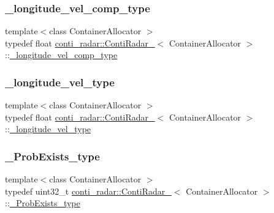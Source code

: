 \subsubsection{\texorpdfstring{\+\_\+longitude\+\_\+vel\+\_\+comp\+\_\+type}{\_longitude\_vel\_comp\_type}}
{\footnotesize\ttfamily template$<$class Container\+Allocator $>$ \\
typedef float \hyperlink{structconti__radar_1_1ContiRadar__}{conti\+\_\+radar\+::\+Conti\+Radar\+\_\+}$<$ Container\+Allocator $>$\+::\hyperlink{structconti__radar_1_1ContiRadar___a3f85fb9d65be899731b3261b3e788197}{\+\_\+longitude\+\_\+vel\+\_\+comp\+\_\+type}}

\mbox{\label{structconti__radar_1_1ContiRadar___af042240d6e52b741e4a641e13e8c0b09}} 
\subsubsection{\texorpdfstring{\+\_\+longitude\+\_\+vel\+\_\+type}{\_longitude\_vel\_type}}
{\footnotesize\ttfamily template$<$class Container\+Allocator $>$ \\
typedef float \hyperlink{structconti__radar_1_1ContiRadar__}{conti\+\_\+radar\+::\+Conti\+Radar\+\_\+}$<$ Container\+Allocator $>$\+::\hyperlink{structconti__radar_1_1ContiRadar___af042240d6e52b741e4a641e13e8c0b09}{\+\_\+longitude\+\_\+vel\+\_\+type}}

\mbox{\label{structconti__radar_1_1ContiRadar___a130da4dcf3dfa54c90c29a54f91d921c}} 
\subsubsection{\texorpdfstring{\+\_\+\+Prob\+Exists\+\_\+type}{\_ProbExists\_type}}
{\footnotesize\ttfamily template$<$class Container\+Allocator $>$ \\
typedef uint32\+\_\+t \hyperlink{structconti__radar_1_1ContiRadar__}{conti\+\_\+radar\+::\+Conti\+Radar\+\_\+}$<$ Container\+Allocator $>$\+::\hyperlink{structconti__radar_1_1ContiRadar___a130da4dcf3dfa54c90c29a54f91d921c}{\+\_\+\+Prob\+Exists\+\_\+type}}

